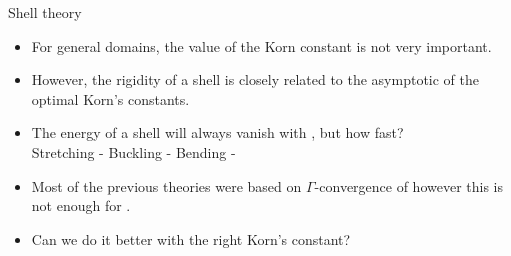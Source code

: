 \documentclass{beamer}
\newcommand{\bul}{{\color{structure}\textbullet}}
\begin{document}
    \begin{frame}{Shell theory}
        \begin{itemize}
            \item[\bul] For general domains, the value of the Korn constant is not very important.
            \vfill
            \item[\bul] However, the rigidity of a shell  is closely related to the asymptotic of the optimal Korn's constants.
            \vfill\pause
            \item[\bul] The energy of a shell will always vanish with , but how fast?
            \\

                 Stretching -   Buckling - Bending -  

            \vfill\pause
            \item[\bul] Most of the previous theories were based on $\Gamma$-convergence  of  however this is not enough for .
            \vfill\pause
            \item[\bul] Can we do it better with the right Korn's constant?
            \end{itemize}
        \end{frame}
\end{document}
